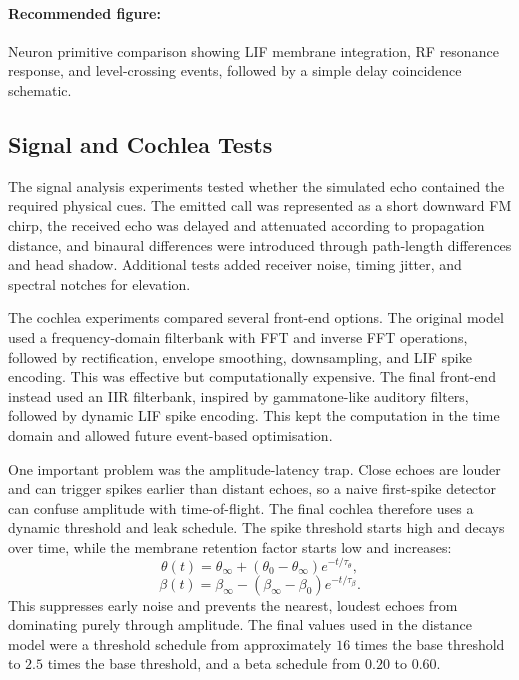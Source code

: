 \paragraph{Recommended figure:} Neuron primitive comparison showing LIF membrane integration, RF resonance response, and level-crossing events, followed by a simple delay coincidence schematic.

\subsection{Signal and Cochlea Tests}

The signal analysis experiments tested whether the simulated echo contained the required physical cues. The emitted call was represented as a short downward FM chirp, the received echo was delayed and attenuated according to propagation distance, and binaural differences were introduced through path-length differences and head shadow. Additional tests added receiver noise, timing jitter, and spectral notches for elevation.

The cochlea experiments compared several front-end options. The original model used a frequency-domain filterbank with FFT and inverse FFT operations, followed by rectification, envelope smoothing, downsampling, and LIF spike encoding. This was effective but computationally expensive. The final front-end instead used an IIR filterbank, inspired by gammatone-like auditory filters, followed by dynamic LIF spike encoding. This kept the computation in the time domain and allowed future event-based optimisation.

One important problem was the amplitude-latency trap. Close echoes are louder and can trigger spikes earlier than distant echoes, so a naive first-spike detector can confuse amplitude with time-of-flight. The final cochlea therefore uses a dynamic threshold and leak schedule. The spike threshold starts high and decays over time, while the membrane retention factor starts low and increases:
\begin{equation}
    \theta(t) = \theta_{\infty} + (\theta_0 - \theta_{\infty})e^{-t/\tau_{\theta}},
\end{equation}
\begin{equation}
    \beta(t) = \beta_{\infty} - (\beta_{\infty}-\beta_0)e^{-t/\tau_{\beta}}.
\end{equation}
This suppresses early noise and prevents the nearest, loudest echoes from dominating purely through amplitude. The final values used in the distance model were a threshold schedule from approximately $16$ times the base threshold to $2.5$ times the base threshold, and a beta schedule from $0.20$ to $0.60$.

